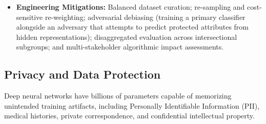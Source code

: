 \documentclass[12pt,a4paper]{article}
\begin{document}
\begin{itemize}[leftmargin=*]
    \item \textbf{Engineering Mitigations:} Balanced dataset curation; re-sampling and cost-sensitive re-weighting; adversarial debiasing (training a primary classifier alongside an adversary that attempts to predict protected attributes from hidden representations); disaggregated evaluation across intersectional subgroups; and multi-stakeholder algorithmic impact assessments.
\end{itemize}

\subsection{Privacy and Data Protection}
Deep neural networks have billions of parameters capable of memorizing unintended training artifacts, including Personally Identifiable Information (PII), medical histories, private correspondence, and confidential intellectual property.
\end{document}
